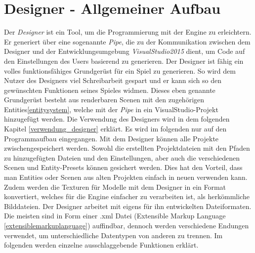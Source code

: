 \section{Designer - Allgemeiner Aufbau}
\label{designer}
Der \textit{Designer} ist ein Tool, um die Programmierung mit der Engine zu erleichtern. Er generiert über eine sogenannte \textit{Pipe}, die zu der Kommunikation zwischen dem Designer und der Entwicklungsumgebung \textit{VisualStudio2015} dient, um Code auf den Einstellungen des Users basierend zu generieren. Der Designer ist fähig ein volles funktionsfähiges Grundgerüst für ein Spiel zu generieren. So wird dem Nutzer des Designers viel Schreibarbeit gespart und er kann sich so den gewünschten Funktionen seines Spieles widmen.
Dieses eben genannte Grundgerüst besteht aus renderbaren Scenen mit den zugehörigen Entities\ref{entitysystem}, welche mit der \textit{Pipe} in ein VisualStudio-Projekt hinzugefügt werden.
Die Verwendung des Designers wird in dem folgenden Kapitel \ref{verwendung_designer} erklärt. Es wird im folgenden nur auf den Programmaufbau eingegangen.
Mit dem Designer können alle Projekte zwischengespeichert werden. Sowohl die erstellten Projektdateien mit den Pfaden zu hinzugefügten Dateien und den Einstellungen, aber auch die verschiedenen Scenen und Entity-Presets können gesichert werden. Dies hat den Vorteil, dass man Entities oder Scenen aus alten Projekten einfach in neuen verwenden kann. Zudem werden die Texturen für Modelle mit dem Designer in ein Format konvertiert, welches für die Engine einfacher zu verarbeiten ist, als herkömmliche Bilddateien.
Der Designer arbeitet mit eigens für ihn entwickelten Dateiformaten. Die meisten sind in Form einer .xml Datei (Extensible Markup Language \cref{extensiblemarkuplanguage}) 
auffindbar, dennoch werden verschiedene Endungen verwendet, um unterschiedliche Datentypen von anderen zu trennen. Im folgenden werden einzelne ausschlaggebende Funktionen erklärt.